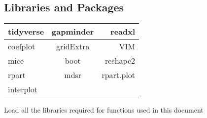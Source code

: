\documentclass{article}\usepackage[]{graphicx}\usepackage[]{color}
\begin{document}
\subsection{Libraries and Packages}
  \begin{center}
    \begin{tabular}{ l | c | r }
    
    \centering

  tidyverse & gapminder & readxl \\ \hline
  coefplot & gridExtra & VIM \\ \hline
  mice & boot & reshape2 \\ \hline
  rpart & mdsr & rpart.plot \\ \hline
  interplot & 

  \end{tabular}
  \end{center}
  Load all the libraries required for functions used in this document
\end{document}
